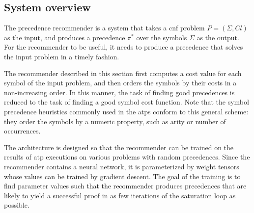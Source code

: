 

\subsection{System overview}

The precedence recommender is a system that takes
a \gls{cnf} problem $P = (\Sigma, \mathit{Cl})$ as the input,
and produces a precedence $\pi^*$ over the symbols $\Sigma$ as the output.
For the recommender to be useful, it needs to produce a precedence
that solves the input problem in a timely fashion.

The recommender described in this section
first computes a cost value for each symbol of the input problem,
and then orders the symbols by their costs in a non-increasing order.
In this manner, the task of finding good precedences is reduced to the task
of finding a good symbol cost function.
Note that the symbol precedence heuristics commonly used in the \glspl{atp}
conform to this general scheme:
they order the symbols by a numeric property, such as arity or number of occurrences.

The architecture is designed so that the recommender can be trained
on the results of \gls{atp} executions on various problems with random precedences.
Since the recommender contains a neural network,
it is parameterized by weight tensors
whose values can be trained by gradient descent.
The goal of the training is to find parameter values such that the recommender produces precedences
that are likely to yield a successful proof in as few iterations of the saturation loop as possible.

